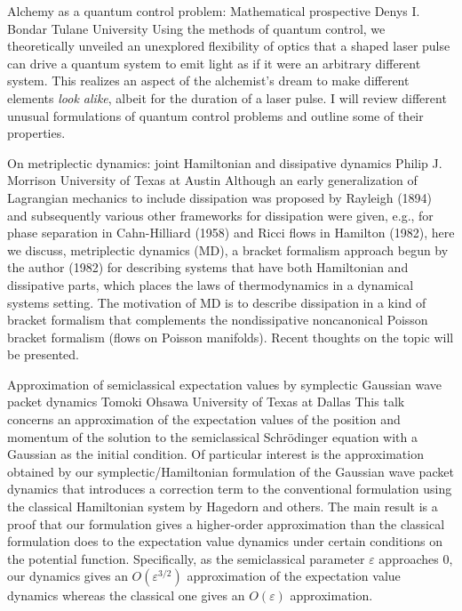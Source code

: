 \abs
{Alchemy as a quantum control problem: Mathematical prospective}
{Denys I. Bondar}
{Tulane University}
{Using the methods of quantum control, we theoretically unveiled an unexplored flexibility of optics that a shaped laser pulse can drive a quantum system to emit light as if it were an arbitrary different system. This realizes an aspect of the alchemist’s dream to make different elements {\it look alike}, albeit for the duration of a laser pulse. I will review different unusual formulations of quantum control problems and outline some of their properties.}

\vspace{1.5ex}
\abs
{On metriplectic dynamics:  joint Hamiltonian and dissipative dynamics}
{Philip J. Morrison}
{University of Texas at Austin}
{Although an early generalization of Lagrangian mechanics to include dissipation was proposed by Rayleigh (1894) and subsequently various other  frameworks for dissipation were given, e.g., for phase separation in Cahn-Hilliard (1958) and Ricci flows in Hamilton (1982),  here we discuss, metriplectic dynamics (MD), a bracket formalism approach begun by the author (1982) for describing systems that have both Hamiltonian and dissipative parts, which places the laws of thermodynamics in a dynamical systems setting.   The motivation of MD is to describe dissipation in a kind of bracket formalism that complements the nondissipative noncanonical Poisson bracket formalism (flows on Poisson manifolds).  Recent thoughts on the topic will be presented.
}


\vspace{1.5ex}
\abs
{Approximation of semiclassical expectation values by symplectic Gaussian wave packet dynamics}
{Tomoki Ohsawa}
{University of Texas at Dallas}
{This talk concerns an approximation of the expectation values of the position and momentum of the solution to the semiclassical Schr\"odinger equation with a Gaussian as the initial condition. Of particular interest is the approximation obtained by our symplectic/Hamiltonian formulation of the Gaussian wave packet dynamics that introduces a correction term to the conventional formulation using the classical Hamiltonian system by Hagedorn and others. The main result is a proof that our formulation gives a higher-order approximation than the classical formulation does to the expectation value dynamics under certain conditions on the potential function. Specifically, as the semiclassical parameter $\varepsilon$ approaches $0$, our dynamics gives an $O(\varepsilon^{3/2})$ approximation of the expectation value dynamics whereas the classical one gives an $O(\varepsilon)$ approximation.}